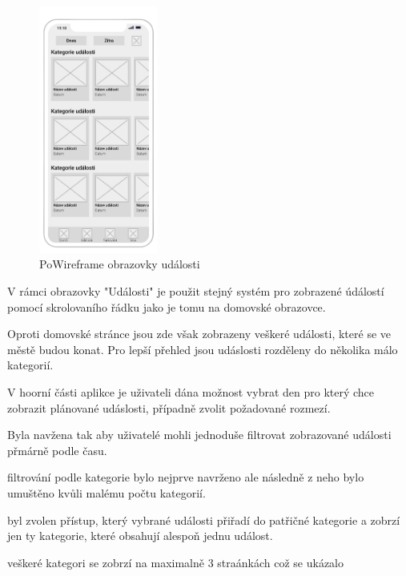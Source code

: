 \begin{figure}
  \centering
  \includegraphics[width=0.35\textwidth]{events_wireframe.png}
  \caption{PoWireframe obrazovky události}
\end{figure}

V rámci obrazovky "Události" je použit stejný systém pro zobrazené údálostí pomocí skrolovaního řádku jako je tomu na domovské obrazovce.

Oproti domovské stránce jsou zde však zobrazeny veškeré události, které se ve městě budou konat. Pro lepší přehled jsou udáslosti rozděleny 
do několika málo kategorií.

V hoorní části aplikce je uživateli dána možnost vybrat den pro který chce zobrazit plánované udáslosti, případně zvolit požadované rozmezí.



Byla navžena tak aby uživatelé mohli jednoduše filtrovat zobrazované události přmárně podle času.

filtrování podle kategorie bylo nejprve navrženo ale následně z neho bylo umuštěno kvůli malému počtu kategorií.

byl zvolen přístup, který vybrané události přiřadí do patřičné kategorie a zobrzí jen ty kategorie, které obsahují alespoň jednu událost.

veškeré kategori se zobrzí na maximalně 3 straánkách což se ukázalo


